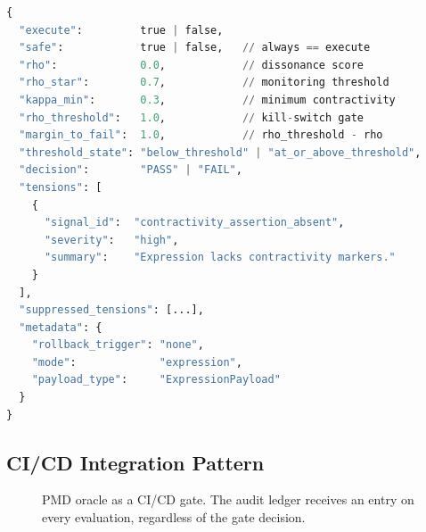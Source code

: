 \documentclass[11pt,letterpaper]{article}
\theoremstyle{remark}
\newcommand{\pmd}{\textsc{pmd}}
\newcommand{\rhosys}{\rho}
\begin{document}
\begin{lstlisting}[language=Python, caption={%
  DissonanceReport wire schema (ADR-015)}]
{
  "execute":         true | false,
  "safe":            true | false,   // always == execute
  "rho":             0.0,            // dissonance score
  "rho_star":        0.7,            // monitoring threshold
  "kappa_min":       0.3,            // minimum contractivity
  "rho_threshold":   1.0,            // kill-switch gate
  "margin_to_fail":  1.0,            // rho_threshold - rho
  "threshold_state": "below_threshold" | "at_or_above_threshold",
  "decision":        "PASS" | "FAIL",
  "tensions": [
    {
      "signal_id":  "contractivity_assertion_absent",
      "severity":   "high",
      "summary":    "Expression lacks contractivity markers."
    }
  ],
  "suppressed_tensions": [...],
  "metadata": {
    "rollback_trigger": "none",
    "mode":             "expression",
    "payload_type":     "ExpressionPayload"
  }
}
\end{lstlisting}

\subsection{CI/CD Integration Pattern}

\begin{figure}[h]
\centering
{}
\caption{PMD oracle as a CI/CD gate.  The audit ledger receives an entry
on every evaluation, regardless of the gate decision.}
\label{fig:cicd}
\end{figure}
\end{document}
